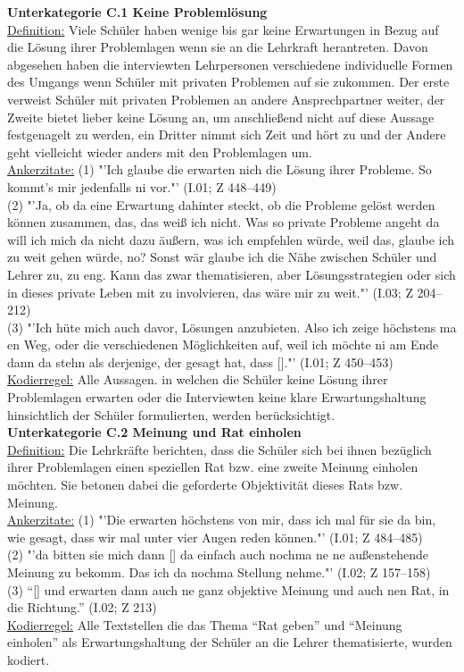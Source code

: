 \textbf{Unterkategorie C.1 Keine Problemlösung}\\
\underline{Definition:} Viele Schüler haben wenige bis gar keine Erwartungen in Bezug auf die Lösung ihrer Problemlagen wenn sie an die Lehrkraft herantreten. Davon abgesehen haben die interviewten Lehrpersonen verschiedene individuelle Formen des Umgangs wenn Schüler mit privaten Problemen auf sie zukommen. Der erste verweist Schüler mit privaten Problemen an andere Ansprechpartner weiter, der Zweite bietet lieber keine Lösung an, um anschließend nicht auf diese Aussage festgenagelt zu werden, ein Dritter nimmt sich Zeit und hört zu und der Andere geht vielleicht wieder anders mit den Problemlagen um.\\
\underline{Ankerzitate:} (1) "'Ich glaube die erwarten nich die Lösung ihrer Probleme. So kommt's mir jedenfalls ni vor."' (I.01; Z 448--449)\\ (2) "'Ja, ob da eine Erwartung dahinter steckt, ob die Probleme gelöst werden können zusammen, das, das weiß ich nicht. Was so private Probleme angeht da will ich mich da nicht dazu äußern, was ich empfehlen würde, weil das, glaube ich zu weit gehen würde, no? Sonst wär glaube ich die Nähe zwischen Schüler und Lehrer zu, zu eng. Kann das zwar thematisieren, aber Lösungsstrategien oder sich in dieses private Leben mit zu involvieren, das wäre mir zu weit."' (I.03; Z 204--212)\\ (3) "'Ich hüte mich auch davor, Lösungen anzubieten. Also ich zeige höchstens ma en Weg, oder die verschiedenen Möglichkeiten auf, weil ich möchte ni am Ende dann da stehn als derjenige, der gesagt hat, dass [\punkte]."' (I.01; Z 450--453)\\
\underline{Kodierregel:} Alle Aussagen. in welchen die Schüler keine Lösung ihrer Problemlagen erwarten oder die Interviewten keine klare Erwartungshaltung hinsichtlich der Schüler formulierten, werden berücksichtigt.\\

\textbf{Unterkategorie C.2 Meinung und Rat einholen}\\
\underline{Definition:} Die Lehrkräfte berichten, dass die Schüler sich bei ihnen bezüglich ihrer Problemlagen einen speziellen Rat bzw. eine zweite Meinung einholen möchten. Sie betonen dabei die geforderte Objektivität dieses Rats bzw. Meinung.\\
\underline{Ankerzitate:} (1) "'Die erwarten höchstens von mir, dass ich mal für sie da bin, wie gesagt, dass wir mal unter vier Augen reden können."' (I.01; Z 484--485)\\ (2) "'da bitten sie mich dann [\punkte] da einfach auch nochma ne ne außenstehende Meinung zu bekomm. Das ich da nochma Stellung nehme."' (I.02; Z 157--158)\\ (3) "`[\punkte] und erwarten dann auch ne ganz objektive Meinung und auch nen Rat, in die Richtung."' (I.02; Z 213)\\
\underline{Kodierregel:} Alle Textstellen die das Thema "`Rat geben"' und "`Meinung einholen"' als Erwartungshaltung der Schüler an die Lehrer thematisierte, wurden kodiert. \\

